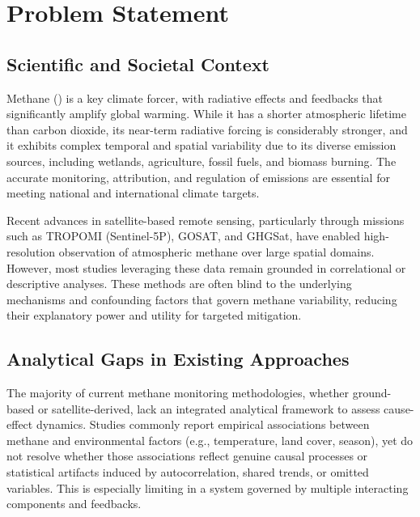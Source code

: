 


\section{Problem Statement}
\label{sec:problem-statement}

\subsection{Scientific and Societal Context}

Methane () is a key climate forcer, with radiative effects and feedbacks that significantly amplify global warming. While it has a shorter atmospheric lifetime than carbon dioxide, its near-term radiative forcing is considerably stronger, and it exhibits complex temporal and spatial variability due to its diverse emission sources, including wetlands, agriculture, fossil fuels, and biomass burning. The accurate monitoring, attribution, and regulation of  emissions are essential for meeting national and international climate targets.

Recent advances in satellite-based remote sensing, particularly through missions such as TROPOMI (Sentinel-5P), GOSAT, and GHGSat, have enabled high-resolution observation of atmospheric methane over large spatial domains. However, most studies leveraging these data remain grounded in correlational or descriptive analyses. These methods are often blind to the underlying mechanisms and confounding factors that govern methane variability, reducing their explanatory power and utility for targeted mitigation.

\subsection{Analytical Gaps in Existing Approaches}

The majority of current methane monitoring methodologies, whether ground-based or satellite-derived, lack an integrated analytical framework to assess cause-effect dynamics. Studies commonly report empirical associations between methane and environmental factors (e.g., temperature, land cover, season), yet do not resolve whether those associations reflect genuine causal processes or statistical artifacts induced by autocorrelation, shared trends, or omitted variables. This is especially limiting in a system governed by multiple interacting components and feedbacks.

